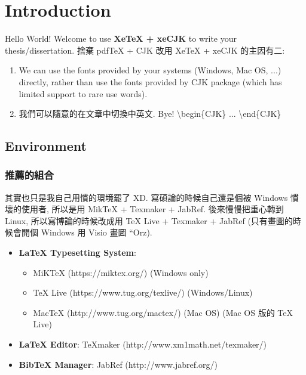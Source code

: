 \chapter{Introduction}
\label{chapter:intro}

Hello World! Welcome to use \textbf{XeTeX + xeCJK} to write your thesis/dissertation.
捨棄 pdfTeX + CJK 改用 XeTeX + xeCJK 的主因有二:
\begin{enumerate}

\item We can use the fonts provided by your systems (Windows, Mac OS, ...) directly, rather than use the fonts provided by CJK package (which has limited support to rare use words).

\item 我們可以隨意的在文章中切換中英文.
Bye! \textbackslash begin\{CJK\} ... \textbackslash end\{CJK\}

\end{enumerate}

\section{Environment}

\subsection{推薦的組合}

其實也只是我自己用慣的環境罷了 XD.
寫碩論的時候自己還是個被 Windows 慣壞的使用者, 所以是用 MikTeX + Texmaker + JabRef.
後來慢慢把重心轉到 Linux, 所以寫博論的時候改成用 TeX Live + Texmaker + JabRef (只有畫圖的時候會開個 Windows 用 Visio 畫圖 ``Orz).

\begin{itemize}

\item \textbf{LaTeX Typesetting System}:
  \begin{itemize}
  \item MiKTeX (https://miktex.org/) (Windows only)
  \item TeX Live (https://www.tug.org/texlive/) (Windows/Linux)
  \item MacTeX (http://www.tug.org/mactex/) (Mac OS) (Mac OS 版的 TeX Live)
  \end{itemize}
\item \textbf{LaTeX Editor}: TeXmaker (http://www.xm1math.net/texmaker/)
\item \textbf{BibTeX Manager}: JabRef (http://www.jabref.org/)

\end{itemize}


